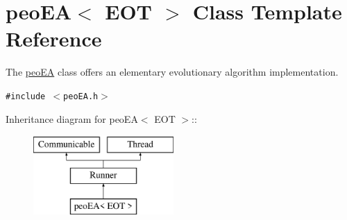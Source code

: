 \hypertarget{classpeoEA}{
\section{peo\-EA$<$ EOT $>$ Class Template Reference}
\label{classpeoEA}
}
The \hyperlink{classpeoEA}{peo\-EA} class offers an elementary evolutionary algorithm implementation.  


{\tt \#include $<$peo\-EA.h$>$}

Inheritance diagram for peo\-EA$<$ EOT $>$::\begin{figure}[H]
\begin{center}
\leavevmode
\includegraphics[height=3cm]{classpeoEA}
\end{center}
\end{figure}
